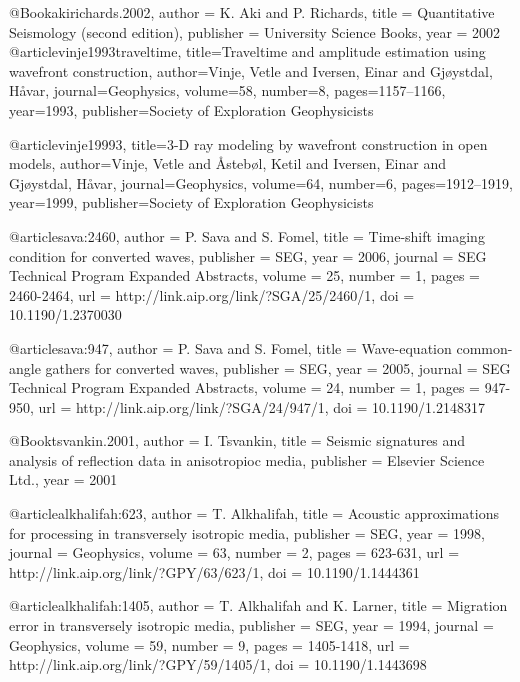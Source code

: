 @Book{akirichards.2002,
  author =	 {K. Aki and P. Richards},
  title =	 {Quantitative Seismology (second edition)},
  publisher =	 {University Science Books},
  year =	 2002
}
@article{vinje1993traveltime,
  title={Traveltime and amplitude estimation using wavefront construction},
  author={Vinje, Vetle and Iversen, Einar and Gj{\o}ystdal, H{\aa}var},
  journal={Geophysics},
  volume={58},
  number={8},
  pages={1157--1166},
  year={1993},
  publisher={Society of Exploration Geophysicists}
}

@article{vinje19993,
  title={3-D ray modeling by wavefront construction in open models},
  author={Vinje, Vetle and {\AA}steb{\o}l, Ketil and Iversen, Einar and Gj{\o}ystdal, H{\aa}var},
  journal={Geophysics},
  volume={64},
  number={6},
  pages={1912--1919},
  year={1999},
  publisher={Society of Exploration Geophysicists}
}



@article{sava:2460,
  author =	 {P. Sava and S. Fomel},
  title =	 {Time-shift imaging condition for converted waves},
  publisher =	 {SEG},
  year =	 2006,
  journal =	 {SEG Technical Program Expanded Abstracts},
  volume =	 25,
  number =	 1,
  pages =	 {2460-2464},
  url =		 {http://link.aip.org/link/?SGA/25/2460/1},
  doi =		 {10.1190/1.2370030}
}

@article{sava:947,
  author =	 {P. Sava and S. Fomel},
  title =	 {Wave-equation common-angle gathers for converted
                  waves},
  publisher =	 {SEG},
  year =	 2005,
  journal =	 {SEG Technical Program Expanded Abstracts},
  volume =	 24,
  number =	 1,
  pages =	 {947-950},
  url =		 {http://link.aip.org/link/?SGA/24/947/1},
  doi =		 {10.1190/1.2148317}
}

@Book{tsvankin.2001,
  author =	 {I. Tsvankin},
  title =	 {Seismic signatures and analysis of reflection data
                  in anisotropioc media},
  publisher =	 {Elsevier Science Ltd.},
  year =	 2001
}

@article{alkhalifah:623,
  author =	 {T. Alkhalifah},
  title =	 {Acoustic approximations for processing in
                  transversely isotropic media},
  publisher =	 {SEG},
  year =	 1998,
  journal =	 {Geophysics},
  volume =	 63,
  number =	 2,
  pages =	 {623-631},
  url =		 {http://link.aip.org/link/?GPY/63/623/1},
  doi =		 {10.1190/1.1444361}
}

@article{alkhalifah:1405,
  author =	 {T. Alkhalifah and K. Larner},
  title =	 {Migration error in transversely isotropic media},
  publisher =	 {SEG},
  year =	 1994,
  journal =	 {Geophysics},
  volume =	 59,
  number =	 9,
  pages =	 {1405-1418},
  url =		 {http://link.aip.org/link/?GPY/59/1405/1},
  doi =		 {10.1190/1.1443698}
}


